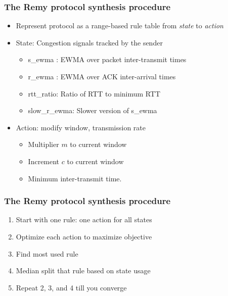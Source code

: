 \begin{frame}
\frametitle{The Remy protocol synthesis procedure}
\begin{itemize}
\item<1-> Represent protocol as a range-based rule table from \textit{state} to \textit{action}
\item<2-> State: Congestion signals tracked by the sender
\begin{itemize}
\item s\_ewma : EWMA over packet inter-transmit times
\item r\_ewma : EWMA over ACK inter-arrival times
\item rtt\_ratio: Ratio of RTT to minimum RTT
\item slow\_r\_ewma: Slower version of s\_ewma
\end{itemize}
\item<3-> Action: modify window, transmission rate
\begin{itemize}
\item Multiplier $m$ to current window
\item Increment $c$ to current window
\item Minimum inter-transmit time.
\end{itemize}
\end{itemize}
\end{frame}

\begin{frame}
\frametitle{The Remy protocol synthesis procedure}
\begin{enumerate}
\item Start with one rule: one action for all states
\item Optimize each action to maximize objective
\item Find most used rule
\item Median split that rule based on state usage
\item Repeat 2, 3, and 4 till you converge
\end{enumerate}
\end{frame}

